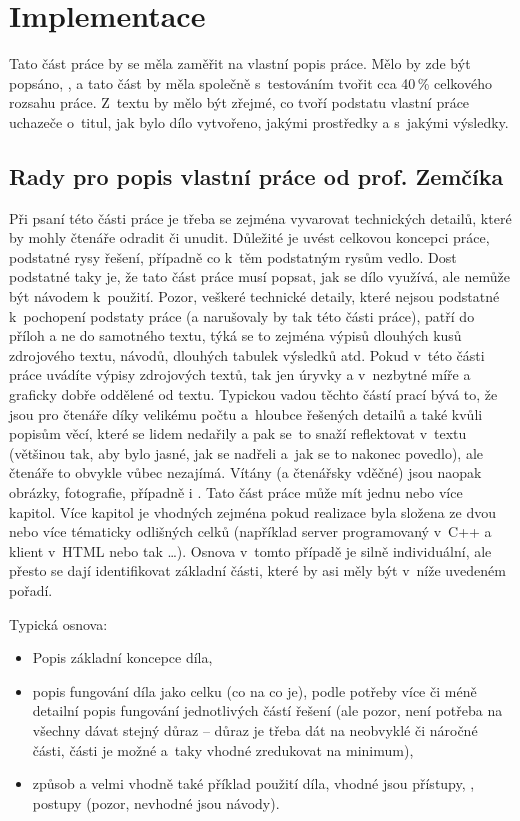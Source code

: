 \section{Implementace}
\label{implementace}

Tato část práce by se měla zaměřit na vlastní popis práce. Mělo by zde být popsáno, , a tato část by měla společně s~testováním tvořit cca 40\,\% celkového rozsahu práce. Z~textu by mělo být zřejmé, co tvoří podstatu vlastní práce uchazeče o~titul, jak bylo dílo vytvořeno, jakými prostředky a s~jakými výsledky.

\subsection*{Rady pro popis vlastní práce od prof. Zemčíka}

Při psaní této části práce je třeba se zejména vyvarovat technických detailů, které by mohly čtenáře odradit či unudit. Důležité je uvést celkovou koncepci práce, podstatné rysy řešení, případně co k~těm podstatným rysům vedlo. Dost podstatné taky je, že tato část práce musí popsat, jak se dílo využívá, ale nemůže být návodem k~použití. Pozor, veškeré technické detaily, které nejsou podstatné k~pochopení podstaty práce (a narušovaly by tak  této části práce), patří do příloh a ne do samotného textu, týká se to zejména výpisů dlouhých kusů zdrojového textu, návodů, dlouhých tabulek výsledků atd. Pokud v~této části práce uvádíte výpisy zdrojových textů, tak jen úryvky a v~nezbytné míře a graficky dobře oddělené od textu. Typickou vadou těchto částí prací bývá to, že jsou pro čtenáře  díky velikému počtu a~hloubce řešených detailů a také kvůli popisům věcí, které se lidem nedařily a pak se~to  snaží reflektovat v~textu (většinou tak, aby bylo jasné, jak se nadřeli a~jak se to nakonec povedlo), ale čtenáře to obvykle vůbec nezajímá. Vítány (a čtenářsky vděčné) jsou naopak obrázky, fotografie, případně i . Tato část práce může mít jednu nebo více kapitol. Více kapitol je vhodných zejména pokud realizace byla složena ze dvou nebo více tématicky odlišných celků (například server programovaný v~C++ a klient v~HTML nebo tak \ldots). Osnova v~tomto případě je silně individuální, ale přesto se dají identifikovat základní části, které by asi měly být v~níže uvedeném pořadí.
\bigskip

\begin{samepage}
\noindent Typická osnova: 
\begin{itemize}
  \item{Popis základní koncepce díla,}
  \item{popis fungování díla jako celku (co na co je), podle potřeby více či méně detailní popis fungování jednotlivých částí řešení (ale pozor, není potřeba na všechny dávat stejný důraz -- důraz je třeba dát na neobvyklé či náročné části,  části je možné a~taky vhodné zredukovat na minimum),}
  \item{způsob a velmi vhodně také příklad použití díla, vhodné jsou  přístupy, , postupy (pozor, nevhodné jsou návody).}
\end{itemize}
\end{samepage}

